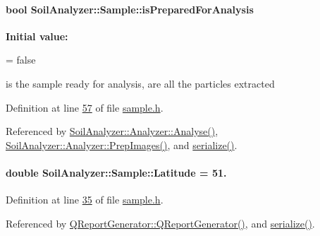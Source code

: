 \hypertarget{class_soil_analyzer_1_1_sample_a0bbd1340cc91d63420ecd9fb4c9dac83}{}
\paragraph[{is\+Prepared\+For\+Analysis}]{\setlength{\rightskip}{0pt plus 5cm}bool Soil\+Analyzer\+::\+Sample\+::is\+Prepared\+For\+Analysis}\label{class_soil_analyzer_1_1_sample_a0bbd1340cc91d63420ecd9fb4c9dac83}
{\bfseries Initial value\+:}
\begin{DoxyCode}
=
      \textcolor{keyword}{false}
\end{DoxyCode}
is the sample ready for analysis, are all the particles extracted 

Definition at line \hyperlink{sample_8h_source_l00057}{57} of file \hyperlink{sample_8h_source}{sample.\+h}.



Referenced by \hyperlink{analyzer_8cpp_source_l00065}{Soil\+Analyzer\+::\+Analyzer\+::\+Analyse()}, \hyperlink{analyzer_8cpp_source_l00033}{Soil\+Analyzer\+::\+Analyzer\+::\+Prep\+Images()}, and \hyperlink{sample_8h_source_l00085}{serialize()}.

\hypertarget{class_soil_analyzer_1_1_sample_aab622a2839ed86ab87f85ad2d1359ff8}{}
\paragraph[{Latitude}]{\setlength{\rightskip}{0pt plus 5cm}double Soil\+Analyzer\+::\+Sample\+::\+Latitude = 51.}\label{class_soil_analyzer_1_1_sample_aab622a2839ed86ab87f85ad2d1359ff8}


Definition at line \hyperlink{sample_8h_source_l00035}{35} of file \hyperlink{sample_8h_source}{sample.\+h}.



Referenced by \hyperlink{qreportgenerator_8cpp_source_l00004}{Q\+Report\+Generator\+::\+Q\+Report\+Generator()}, and \hyperlink{sample_8h_source_l00085}{serialize()}.

\hypertarget{class_soil_analyzer_1_1_sample_afa863082d9931f8b5a7ab2429446c132}{}
